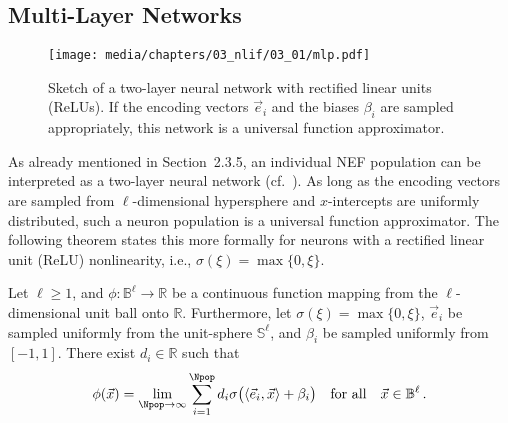 
\subsection{Multi-Layer Networks}

\begin{figure}
	\texttt{[image: media/chapters/03\_nlif/03\_01/mlp.pdf]}
	\caption[Sketch of a two-layer neural network]{Sketch of a two-layer neural network with rectified linear units (ReLUs). If the encoding vectors $\vec e_i$ and the biases $\beta_i$ are sampled appropriately, this network is a universal function approximator.}
	\label{fig:mlp}
\end{figure}

As already mentioned in Section~2.3.5, an individual NEF population can be interpreted as a two-layer neural network (cf.~).
As long as the encoding vectors are sampled from $\ell$-dimensional hypersphere and $x$-intercepts are uniformly distributed, such a neuron population is a universal function approximator.
The following theorem states this more formally for neurons with a rectified linear unit (ReLU) nonlinearity, i.e., $\sigma(\xi) = \max\{0, \xi\}$.

\begin{theorem}
\label{thm:two_layer_universal}
Let $\ell \geq 1$, and $\phi : \mathbb{B}^\ell \longrightarrow \mathbb{R}$ be a continuous function mapping from the $\ell$-dimensional unit ball onto $\mathbb{R}$.
Furthermore, let $\sigma(\xi) = \max\{0, \xi\}$, $\vec e_i$ be sampled uniformly from the unit-sphere $\mathbb{S}^\ell$, and $\beta_i$ be sampled uniformly from $[-1, 1]$.
There exist $d_i \in \mathbb{R}$ such that
\begin{align}
	\phi(\vec x) = \lim_{\Npop \to \infty} \sum_{i = 1}^{\Npop} d_i \sigma\bigl( \langle \vec e_i, \vec x \rangle + \beta_i \bigr) \quad \text{for all} \quad \vec x \in \mathbb{B}^\ell \,.
	\label{eqn:two_layer_network}
\end{align}
\end{theorem}

